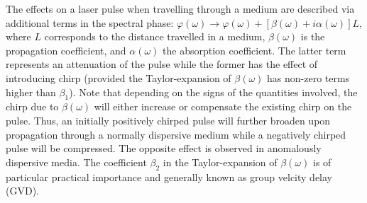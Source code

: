 \documentclass[a4paper]{jpconf}
\begin{document}
The effects on a laser pulse when travelling through a medium are described via additional terms in the spectral phase: $\varphi(\omega) \to \varphi(\omega) + [\beta(\omega) + i \alpha(\omega)]L$, where $L$ corresponds to the distance travelled in a medium, $\beta(\omega)$ is the propagation coefficient, and $\alpha(\omega)$ the absorption coefficient. The latter term represents an attenuation of the pulse while the former has the effect of introducing chirp (provided the Taylor-expansion of $\beta(\omega)$ has non-zero terms higher than $\beta_1$). Note that depending on the signs of the quantities involved, the chirp due to $\beta(\omega)$ will either increase or compensate the existing chirp on the pulse. Thus, an initially positively chirped pulse will further broaden upon propagation through a normally dispersive medium while a negatively chirped pulse will be compressed. The opposite effect is observed in anomalously dispersive media. The coefficient $\beta_2$ in the Taylor-expansion of $\beta(\omega)$ is of particular practical importance and generally known as group velcity delay (GVD).
\end{document}
